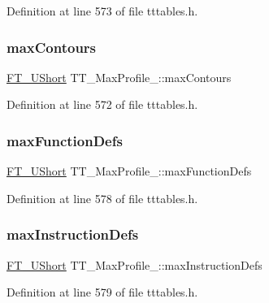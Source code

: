 Definition at line 573 of file tttables.\+h.

\mbox{\label{struct_t_t___max_profile___a5af98bd8149008d0a33b61d9730262a9}} 
\subsubsection{\texorpdfstring{maxContours}{maxContours}}
{\footnotesize\ttfamily \mbox{\hyperlink{fttypes_8h_a937f6c17cf5ffd09086d8610c37b9f58}{F\+T\+\_\+\+U\+Short}} T\+T\+\_\+\+Max\+Profile\+\_\+\+::max\+Contours}



Definition at line 572 of file tttables.\+h.

\mbox{\label{struct_t_t___max_profile___acc24e822a62bbfaa86d36f691fcde60b}} 
\subsubsection{\texorpdfstring{maxFunctionDefs}{maxFunctionDefs}}
{\footnotesize\ttfamily \mbox{\hyperlink{fttypes_8h_a937f6c17cf5ffd09086d8610c37b9f58}{F\+T\+\_\+\+U\+Short}} T\+T\+\_\+\+Max\+Profile\+\_\+\+::max\+Function\+Defs}



Definition at line 578 of file tttables.\+h.

\mbox{\label{struct_t_t___max_profile___a3f7bd433baede417293415cf60f20d8f}} 
\subsubsection{\texorpdfstring{maxInstructionDefs}{maxInstructionDefs}}
{\footnotesize\ttfamily \mbox{\hyperlink{fttypes_8h_a937f6c17cf5ffd09086d8610c37b9f58}{F\+T\+\_\+\+U\+Short}} T\+T\+\_\+\+Max\+Profile\+\_\+\+::max\+Instruction\+Defs}



Definition at line 579 of file tttables.\+h.

